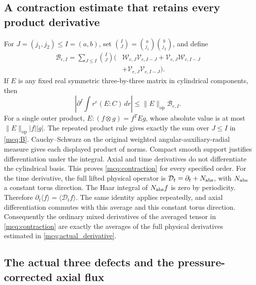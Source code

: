 \subsection{A contraction estimate that retains every product derivative}

For \(J=(j_1,j_2)\le I=(a,b)\), set
\(\binom IJ=\binom a{j_1}\binom b{j_2}\), and define
\begin{equation}\label{mcq:B}
\begin{split}
 \mathcal B_{e,I}=\sum_{J\le I}\binom IJ
 \bigl(&\mathcal W_{e,J}\mathcal V_{e,I-J}
       +\mathcal V_{e,J}\mathcal W_{e,I-J}\\
       &+\mathcal V_{e,J}\mathcal V_{e,I-J}\bigr).
\end{split}
\end{equation}
If \(E\) is any fixed real symmetric three-by-three matrix in
cylindrical components, then
\begin{equation}\label{mcq:contraction}
 \left|\partial^I\int r^e(E:C)\,dr\right|
       \le \|E\|_{\mathrm{op}}\mathcal B_{e,I}.
\end{equation}
For a single outer product,
\(E:(f\otimes g)=f^TEg\), whose absolute value is at most
\(\|E\|_{\mathrm{op}}|f||g|\). The repeated product rule gives exactly
the sum over \(J\le I\) in \eqref{mcq:B}. Cauchy--Schwarz on the
original weighted angular-auxiliary-radial measure gives each displayed
product of norms. Compact smooth support justifies differentiation
under the integral. Axial and time derivatives do not differentiate
the cylindrical basis. This proves \eqref{mcq:contraction} for every
specified order.
For the time derivative, the full lifted physical operator is
\(\mathcal D_t=\partial_t+N_{\rm abs}\), with \(N_{\rm abs}\) a
constant torus direction. The Haar integral of \(N_{\rm abs}f\) is
zero by periodicity. Therefore
\(\partial_t\langle f\rangle=\langle\mathcal D_tf\rangle\).
The same identity applies repeatedly, and axial differentiation commutes
with this average and this constant torus direction. Consequently the
ordinary mixed derivatives of the averaged tensor in
\eqref{mcq:contraction} are exactly the averages of the full physical
derivatives estimated in \eqref{mcq:actual_derivative}.

\subsection{The actual three defects and the pressure-corrected axial flux}

